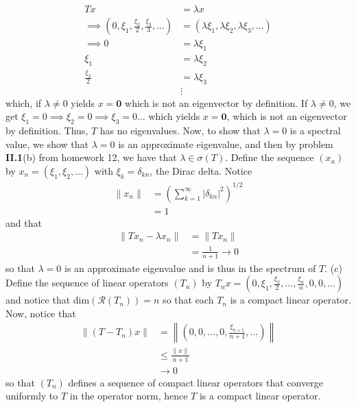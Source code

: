 \documentclass{article}
\begin{document}
\begin{itemize}
\begin{align*}
        Tx &= \lambda x\\
        \implies \left(0, \xi_1, \frac{\xi_2}{2}, \frac{\xi_3}{3}, \dots\right) &= (\lambda \xi_1, \lambda \xi_2, \lambda \xi_3,\dots)\\
        \implies 0 &= \lambda\xi_1\\
        \xi_1 &= \lambda\xi_2\\
        \frac{\xi_2}{2} &= \lambda \xi_3\\
        &\vdots
    \end{align*}
    which, if $\lambda \neq 0$ yields $x = \mathbf{0}$ which is not an eigenvector by definition. If $\lambda \neq 0$, we get $\xi_1 = 0 \implies \xi_2 = 0\implies \xi_3 = 0 \dots$ which yields $x = \mathbf{0}$, which is not an eigenvector by definition. Thus, $T$ has no eigenvalues. Now, to show that $\lambda = 0$ is a spectral value, we show that $\lambda = 0$ is an approximate eigenvalue, and then by problem \textbf{II.1}(b) from homework 12, we have that $\lambda \in \sigma(T)$. Define the sequence $(x_n)$ by $x_n = (\xi_1, \xi_2, \dots)$ with $\xi_k = \delta_{kn}$, the Dirac delta. Notice
    \begin{align*}
        \|x_n\| &= \left(\sum_{k = 1}^{\infty} \left|\delta_{kn}\right|^2\right)^{1/2}\\
        &= 1
    \end{align*}
    and that
    \begin{align*}
        \|Tx_n - \lambda x_n\| &= \|Tx_n\|\\
        &= \frac{1}{n+1} \to 0
    \end{align*}
    so that $\lambda = 0$ is an approximate eigenvalue and is thus in the spectrum of $T$.
    \newline\newline
    (c) Define the sequence of linear operators $(T_n)$ by $T_nx = \left(0, \xi_1, \frac{\xi_2}{2},\dots, \frac{\xi_n}{n}, 0, 0,\dots\right)$ and notice that $\text{dim}(\mathcal{R}(T_n)) = n$ so that each $T_n$ is a compact linear operator. Now, notice that
    \begin{align*}
        \|(T - T_n)x\| &= \left\|\left(0,0,\dots,0, \frac{\xi_{n+1}}{n+1},\dots\right)\right\|\\
        &\leq \frac{\|x\|}{n+1}\\
        &\to 0
    \end{align*}
    so that $(T_n)$ defines a sequence of compact linear operators that converge uniformly to $T$ in the operator norm, hence $T$ is a compact linear operator.

\end{itemize}
\end{document}
